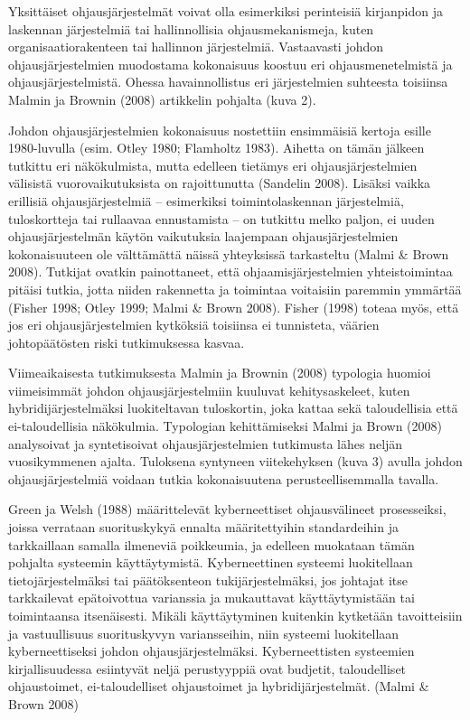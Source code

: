 \documentclass[12pt,a4paper,oneside,pdftex]{report}
\begin{document}
Yksittäiset ohjausjärjestelmät voivat olla esimerkiksi perinteisiä kirjanpidon ja laskennan järjestelmiä tai hallinnollisia ohjausmekanismeja, kuten organisaatiorakenteen tai hallinnon järjestelmiä. Vastaavasti johdon ohjausjärjestelmien muodostama kokonaisuus koostuu eri ohjausmenetelmistä ja ohjausjärjestelmistä. Ohessa havainnollistus eri järjestelmien suhteesta toisiinsa Malmin ja Brownin (2008) artikkelin pohjalta (kuva 2).

Johdon ohjausjärjestelmien kokonaisuus nostettiin ensimmäisiä kertoja esille 1980-luvulla (esim. Otley 1980; Flamholtz 1983). Aihetta on tämän jälkeen tutkittu eri näkökulmista, mutta edelleen tietämys eri ohjausjärjestelmien välisistä vuorovaikutuksista on rajoittunutta (Sandelin 2008). Lisäksi vaikka erillisiä ohjausjärjestelmiä – esimerkiksi toimintolaskennan järjestelmiä, tuloskortteja tai rullaavaa ennustamista – on tutkittu melko paljon, ei uuden ohjausjärjestelmän käytön vaikutuksia laajempaan ohjausjärjestelmien kokonaisuuteen ole välttämättä näissä yhteyksissä tarkasteltu (Malmi & Brown 2008). Tutkijat ovatkin painottaneet, että ohjaamisjärjestelmien yhteistoimintaa pitäisi tutkia, jotta niiden rakennetta ja toimintaa voitaisiin paremmin ymmärtää (Fisher 1998; Otley 1999; Malmi & Brown 2008). Fisher (1998) toteaa myös, että jos eri ohjausjärjestelmien kytköksiä toisiinsa ei tunnisteta, väärien johtopäätösten riski tutkimuksessa kasvaa.

Viimeaikaisesta tutkimuksesta Malmin ja Brownin (2008) typologia huomioi viimeisimmät johdon ohjausjärjestelmiin kuuluvat kehitysaskeleet, kuten hybridijärjestelmäksi luokiteltavan tuloskortin, joka kattaa sekä taloudellisia että ei-taloudellisia näkökulmia. Typologian kehittämiseksi Malmi ja Brown (2008) analysoivat ja syntetisoivat ohjausjärjestelmien tutkimusta lähes neljän vuosikymmenen ajalta. Tuloksena syntyneen viitekehyksen (kuva 3) avulla johdon ohjausjärjestelmiä voidaan tutkia kokonaisuutena perusteellisemmalla tavalla.

Green ja Welsh (1988) määrittelevät kyberneettiset ohjausvälineet prosesseiksi, joissa verrataan suorituskykyä ennalta määritettyihin standardeihin ja tarkkaillaan samalla ilmeneviä poikkeumia, ja edelleen muokataan tämän pohjalta systeemin käyttäytymistä. Kyberneettinen systeemi luokitellaan tietojärjestelmäksi tai päätöksenteon tukijärjestelmäksi, jos johtajat itse tarkkailevat epätoivottua varianssia ja mukauttavat käyttäytymistään tai toimintaansa itsenäisesti. Mikäli käyttäytyminen kuitenkin kytketään tavoitteisiin ja vastuullisuus suorituskyvyn variansseihin, niin systeemi luokitellaan kyberneettiseksi johdon ohjausjärjestelmäksi. Kyberneettisten systeemien kirjallisuudessa esiintyvät neljä perustyyppiä ovat budjetit, taloudelliset ohjaustoimet, ei-taloudelliset ohjaustoimet ja hybridijärjestelmät. (Malmi & Brown 2008)
\end{document}
